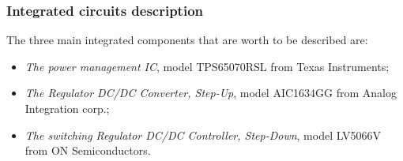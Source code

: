 \documentclass[11pt,a4paper,titlepage]{article}
\begin{document}
      \subsubsection{Integrated circuits description}
        The three main integrated components that are worth to be described are:
        \begin{itemize}
          \item \textit{The power management IC}, model TPS65070RSL from Texas Instruments;
          \item \textit{The Regulator DC/DC Converter, Step-Up}, model AIC1634GG from Analog Integration corp.;
          \item \textit{The switching Regulator DC/DC Controller, Step-Down}, model LV5066V from ON Semiconductors.
        \end{itemize}
\end{document}
